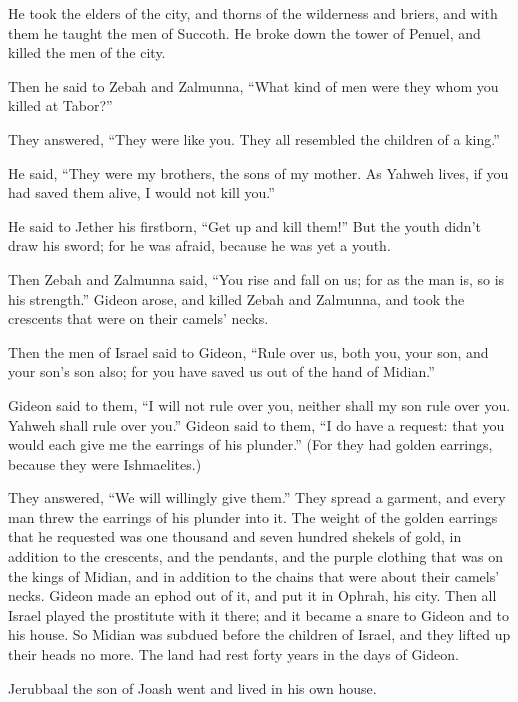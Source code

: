 {He took the elders of the city, and thorns of the wilderness and briers, and with them he taught the men of Succoth.
He broke down the tower of Penuel, and killed the men of the city.
\par }{\PP {}Then he said to Zebah and Zalmunna, “What kind of men were they whom you killed at Tabor?”
\par }{\PP They answered, “They were like you. They all resembled the children of a king.”
\par }{\PP {}He said, “They were my brothers, the sons of my mother. As Yahweh lives, if you had saved them alive, I would not kill you.”
\par }{\PP {}He said to Jether his firstborn, “Get up and kill them!” But the youth didn’t draw his sword; for he was afraid, because he was yet a youth.
\par }{\PP {}Then Zebah and Zalmunna said, “You rise and fall on us; for as the man is, so is his strength.” Gideon arose, and killed Zebah and Zalmunna, and took the crescents that were on their camels’ necks.
\par }{\PP {}Then the men of Israel said to Gideon, “Rule over us, both you, your son, and your son’s son also; for you have saved us out of the hand of Midian.”
\par }{\PP {}Gideon said to them, “I will not rule over you, neither shall my son rule over you. Yahweh shall rule over you.”
Gideon said to them, “I do have a request: that you would each give me the earrings of his plunder.” (For they had golden earrings, because they were Ishmaelites.)
\par }{\PP {}They answered, “We will willingly give them.” They spread a garment, and every man threw the earrings of his plunder into it.
The weight of the golden earrings that he requested was one thousand and seven hundred shekels of gold, in addition to the crescents, and the pendants, and the purple clothing that was on the kings of Midian, and in addition to the chains that were about their camels’ necks.
Gideon made an ephod out of it, and put it in Ophrah, his city. Then all Israel played the prostitute with it there; and it became a snare to Gideon and to his house.
So Midian was subdued before the children of Israel, and they lifted up their heads no more. The land had rest forty years in the days of Gideon.
\par }{\PP {}Jerubbaal the son of Joash went and lived in his own house.
}
